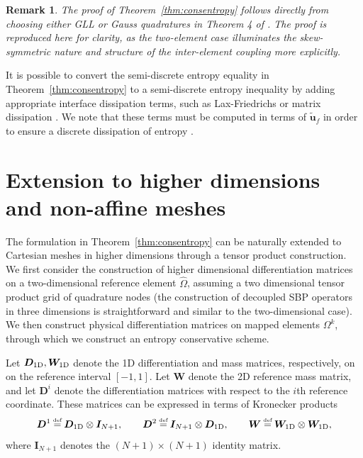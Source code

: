 \documentclass[review,onefignum,onetabnum,final]{siamart171218}
\newtheorem*{remark}{Remark}
\renewcommand{\tilde}{\widetilde}
\renewcommand{\hat}{\widehat}
\newcommand\myeq{\mathrel{\stackrel{\makebox[0pt]{\mbox{\normalfont\tiny def}}}{=}}}
\begin{document}
\begin{remark}
The proof of Theorem~\ref{thm:consentropy} follows directly from choosing either GLL or Gauss quadratures in Theorem 4 of \cite{chan2017discretely}.  The proof is reproduced here for clarity, as the two-element case illuminates the skew-symmetric nature and structure of the inter-element coupling more explicitly.  
\end{remark}

It is possible to convert the semi-discrete entropy equality in Theorem~\ref{thm:consentropy} to a semi-discrete entropy inequality by adding appropriate interface dissipation terms, such as Lax-Friedrichs or matrix dissipation \cite{winters2017uniquely}.  We note that these terms must be computed in terms of $\tilde{\bm{u}}_f$ in order to ensure a discrete dissipation of entropy \cite{chen2017entropy, chan2017discretely}.  

\section{Extension to higher dimensions and non-affine meshes}
\label{sec:2}

The formulation in Theorem~\ref{thm:consentropy} can be naturally extended to Cartesian meshes in higher dimensions through a tensor product construction.  We first consider the construction of higher dimensional differentiation matrices on a two-dimensional reference element $\hat{\Omega}$, assuming a two dimensional tensor product grid of quadrature nodes (the construction of decoupled SBP operators in three dimensions is straightforward and similar to the two-dimensional case).  We then construct physical differentiation matrices on mapped elements $\Omega^k$, through which we construct an entropy conservative scheme.  

Let $\bm{D}_{\rm 1D}, \bm{W}_{\rm 1D}$ denote the 1D differentiation and mass matrices, respectively, on on the reference interval $[-1,1]$.  Let ${\bm{W}}$ denote the 2D reference mass matrix, and let ${\bm{D}}^i$ denote the differentiation matrices with respect to the $i$th reference coordinate.  These matrices can be expressed in terms of Kronecker products  
\[
{\bm{D}}^1 \myeq \bm{D}_{\rm 1D} \otimes \bm{I}_{N+1}, \qquad {\bm{D}}^2  \myeq \bm{I}_{N+1} \otimes \bm{D}_{\rm 1D}, \qquad {\bm{W}} \myeq \bm{W}_{\rm 1D} \otimes  \bm{W}_{\rm 1D}, 
\]
where $\bm{I}_{N+1}$ denotes the $(N+1)\times (N+1)$ identity matrix.  %
\end{document}
